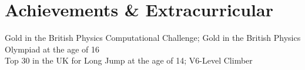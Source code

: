 \section{Achievements \& Extracurricular}
\begin{itemize}[leftmargin=0.15in, label={}]
\small{\item{
    {Gold in the British Physics Computational Challenge; Gold in the British Physics Olympiad at the age of 16}\\
    {Top 30 in the UK for Long Jump at the age of 14; V6-Level Climber}
}}
\end{itemize}
